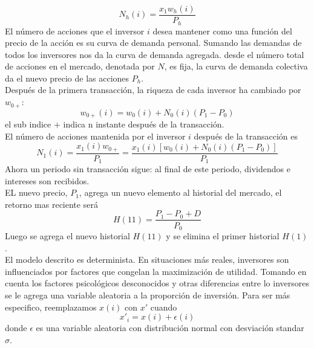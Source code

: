 \documentclass[12pt,a4paper]{article}
\begin{document}
\begin{equation}
N_h(i) = \frac{x_1w_h(i)}{P_h}
\end{equation} 
\quad El número de acciones que el inversor $i$ desea mantener como una función del precio de la acción es su curva de demanda personal. Sumando las demandas de todos los inversores nos da la curva de demanda agregada. desde el número total de acciones en el mercado, denotada por $N$, es fija, la curva de demanda colectiva da el nuevo precio de las acciones $P_h$.\\
\quad Después de la primera transacción, la riqueza de cada inversor ha cambiado por $w_{0+}$:
\begin{equation}
w_{0+}(i) = w_0(i) +N_0(i)(P_1-P_0)
\end{equation} 
el sub indice $+$ indica n instante después de la transacción.\\
\quad El número de acciones mantenida por el inversor $i$ después de la transacción es
\begin{equation}
N_1(i)=\frac{x_1(i)w_{0+}}{P_1}=\frac{x_1(i)[w_0(i) +N_0(i)(P_1-P_0)]}{P_1}
\end{equation} 
\quad Ahora un periodo sin transacción sigue: al final de este periodo, dividendos e intereses son recibidos.\\
\quad EL nuevo precio, $P_1$, agrega un nuevo elemento al historial del mercado, el retorno mas reciente será
\begin{equation}
H(11) = \frac{P_1-P_0+D}{P_0}
\end{equation}
Luego se agrega el nuevo historial $H(11)$ y se elimina el primer historial $H(1)$.\\
\quad El modelo descrito es determinista. En situaciones más reales, inversores son influenciados por factores que congelan la maximización de utilidad. Tomando en cuenta los factores psicológicos desconocidos y otras diferencias entre lo inversores se le agrega una variable aleatoria a la proporción de inversión. Para ser más especifico, reemplazamos $x(i)$ con $x'$ cuando
\begin{equation}
x'_i = x(i) + \epsilon(i)
\end{equation}
donde $\epsilon$ es una variable aleatoria con distribución normal con desviación standar $\sigma$. 
\end{document}

